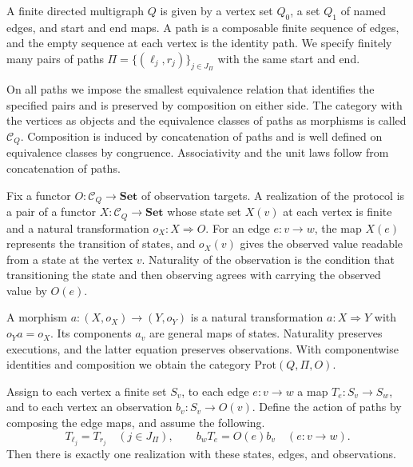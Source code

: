 \begin{definition}\label{def:1.36}

A finite directed multigraph $Q$ is given by a vertex set $Q_0$, a set $Q_1$ of
named edges, and start and end maps.
A path is a composable finite sequence of edges, and the empty sequence at each
vertex is the identity path.
We specify finitely many pairs of paths
$\Pi=\{(\ell_j,r_j)\}_{j\in J_\Pi}$ with the same start and end.

On all paths we impose the smallest equivalence relation that identifies the
specified pairs and is preserved by composition on either side.
The category with the vertices as objects and the equivalence classes of paths
as morphisms is called $\mathcal{C}_Q$.
Composition is induced by concatenation of paths and is well defined on
equivalence classes by congruence.
Associativity and the unit laws follow from concatenation of paths.

Fix a functor $O:\mathcal{C}_Q\to{\mathbf{Set}}$ of observation targets.
A realization of the protocol is a pair of a functor
$X:\mathcal{C}_Q\to{\mathbf{Set}}$ whose state set $X(v)$ at each vertex is
finite and a natural transformation $o_X:X\Rightarrow O$.
For an edge $e:v\to w$, the map $X(e)$ represents the transition of states, and
$o_X(v)$ gives the observed value readable from a state at the vertex $v$.
Naturality of the observation is the condition that transitioning the state
and then observing agrees with carrying the observed value by $O(e)$.

A morphism $a:(X,o_X)\to(Y,o_Y)$ is a natural transformation $a:X\Rightarrow Y$
with $o_Ya=o_X$. Its components $a_v$ are general maps of states.
Naturality preserves executions, and the latter equation preserves
observations.
With componentwise identities and composition we obtain the category
$\mathrm{Prot}(Q,\Pi,O)$.

\end{definition}

\begin{proposition}\label{prop:1.37}

Assign to each vertex a finite set $S_v$, to each edge $e:v\to w$ a map
$T_e:S_v\to S_w$, and to each vertex an observation $b_v:S_v\to O(v)$.
Define the action of paths by composing the edge maps, and assume the
following.
\begin{equation*}
T_{\ell_j}=T_{r_j}\quad(j\in J_\Pi),\qquad
b_wT_e=O(e)b_v\quad(e:v\to w).
\tag{1.21}\label{eq:1.21}
\end{equation*}
Then there is exactly one realization with these states, edges, and
observations.

\end{proposition}


